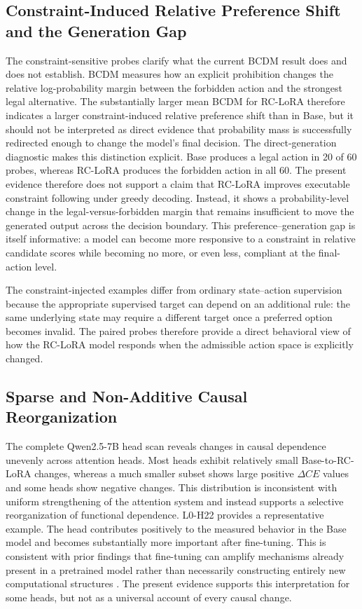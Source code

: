 \subsection{Constraint-Induced Relative Preference Shift and the Generation Gap}
\label{sec:discussion_preference}

The constraint-sensitive probes clarify what the current BCDM result does and does not establish. BCDM measures how an explicit prohibition changes the relative log-probability margin between the forbidden action and the strongest legal alternative. The substantially larger mean BCDM for RC-LoRA therefore indicates a larger constraint-induced relative preference shift than in Base, but it should not be interpreted as direct evidence that probability mass is successfully redirected enough to change the model's final decision. The direct-generation diagnostic makes this distinction explicit. Base produces a legal action in 20 of 60 probes, whereas RC-LoRA produces the forbidden action in all 60. The present evidence therefore does not support a claim that RC-LoRA improves executable constraint following under greedy decoding. Instead, it shows a probability-level change in the legal-versus-forbidden margin that remains insufficient to move the generated output across the decision boundary. This preference--generation gap is itself informative: a model can become more responsive to a constraint in relative candidate scores while becoming no more, or even less, compliant at the final-action level.

The constraint-injected examples differ from ordinary state--action supervision because the appropriate supervised target can depend on an additional rule: the same underlying state may require a different target once a preferred option becomes invalid. The paired probes therefore provide a direct behavioral view of how the RC-LoRA model responds when the admissible action space is explicitly changed.

\subsection{Sparse and Non-Additive Causal Reorganization}
\label{sec:discussion_reconfiguration}

The complete Qwen2.5-7B head scan reveals changes in causal dependence unevenly across attention heads. Most heads exhibit relatively small Base-to-RC-LoRA changes, whereas a much smaller subset shows large positive $\Delta CE$ values and some heads show negative changes. This distribution is inconsistent with uniform strengthening of the attention system and instead supports a selective reorganization of functional dependence. L0-H22 provides a representative example. The head contributes positively to the measured behavior in the Base model and becomes substantially more important after fine-tuning. This is consistent with prior findings that fine-tuning can amplify mechanisms already present in a pretrained model rather than necessarily constructing entirely new computational structures \cite{prakash2024finetuning}. The present evidence supports this interpretation for some heads, but not as a universal account of every causal change.

